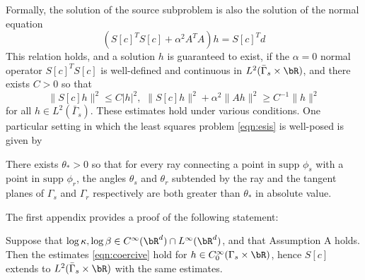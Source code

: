 Formally, the solution of the source subproblem is also the solution of the normal equation
\begin{equation}
\label{eqn:normal}
(S[c]^TS[c] + \alpha^2 A^TA) h = S[c]^T d 
\end{equation}
This relation holds, and a solution $h$ is guaranteed to exist, if the $\alpha=0$ normal operator $S[c]^TS[c]$ is well-defined and continuous in $L^2(\bar{\Gamma}_s \times \bR)$, and there exists $C>0$ so that 
\begin{equation}
\label{eqn:coercive}
\|S[c]h\|^2 \le C|h|^2,\,\,\|S[c]h\|^2 + \alpha^2 \|Ah\|^2 \ge C^{-1}\|h\|^2
\end{equation}
for all $h \in L^2(\bar{\Gamma}_s)$. These estimates hold under various conditions. One particular setting in which the least squares problem \ref{eqn:esis} is well-posed is given by 

 There exists $\theta_*>0$ so that for every ray connecting a point in $\mbox{supp }\phi_s$ with a point in $\mbox{supp }\phi_r$, the angles $\theta_s$ and $\theta_r$ subtended by the ray and the tangent planes of $\Gamma_s$ and $\Gamma_r$ respectively are both greater than $\theta_*$ in absolute value.

The first appendix provides a proof of the following statement:

\begin{theorem} 
\label{thm:one}
Suppose that $\log \kappa, \log \beta \in C^{\infty}(\bR^d) \cap L^{\infty}(\bR^d)$, and that Assumption A holds. Then the estimates \ref{eqn:coercive} hold for $h \in C^{\infty}_0(\Gamma_s \times \bR)$, hence $S[c]$ extends to $L^2(\bar{\Gamma}_s \times \bR)$ with the same estimates.
\end{theorem}


